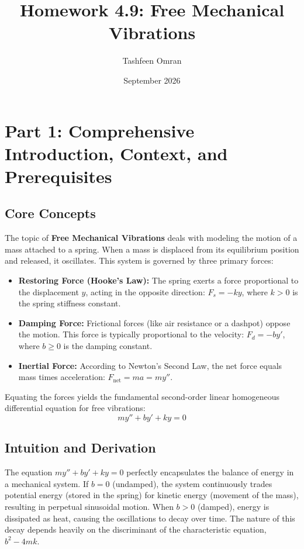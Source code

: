 \documentclass[11pt]{article}
\title{Homework 4.9: Free Mechanical Vibrations}
\author{Tashfeen Omran}
\date{September 2026}
\begin{document}
\maketitle
\tableofcontents
\newpage

\section{Part 1: Comprehensive Introduction, Context, and Prerequisites}

\subsection{Core Concepts}
The topic of \textbf{Free Mechanical Vibrations} deals with modeling the motion of a mass attached to a spring. When a mass is displaced from its equilibrium position and released, it oscillates. This system is governed by three primary forces:
\begin{itemize}
    \item \textbf{Restoring Force (Hooke's Law):} The spring exerts a force proportional to the displacement $y$, acting in the opposite direction: $F_s = -ky$, where $k > 0$ is the spring stiffness constant.
    \item \textbf{Damping Force:} Frictional forces (like air resistance or a dashpot) oppose the motion. This force is typically proportional to the velocity: $F_d = -by'$, where $b \ge 0$ is the damping constant.
    \item \textbf{Inertial Force:} According to Newton's Second Law, the net force equals mass times acceleration: $F_{\text{net}} = ma = my''$.
\end{itemize}
Equating the forces yields the fundamental second-order linear homogeneous differential equation for free vibrations:
\[ my'' + by' + ky = 0 \]

\subsection{Intuition and Derivation}
The equation $my'' + by' + ky = 0$ perfectly encapsulates the balance of energy in a mechanical system. If $b = 0$ (undamped), the system continuously trades potential energy (stored in the spring) for kinetic energy (movement of the mass), resulting in perpetual sinusoidal motion. When $b > 0$ (damped), energy is dissipated as heat, causing the oscillations to decay over time. The nature of this decay depends heavily on the discriminant of the characteristic equation, $b^2 - 4mk$.
\end{document}
